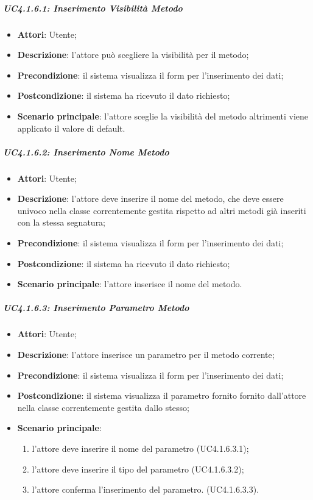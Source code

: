 \subparagraph{UC4.1.6.1: Inserimento Visibilità Metodo}
\label{UC4.1.6.1}
\begin{itemize}
\item \textbf{Attori}: Utente;
\item \textbf{Descrizione}: l'attore può scegliere la visibilità per il metodo;
\item \textbf{Precondizione}: il sistema visualizza il form per l'inserimento dei dati;
\item \textbf{Postcondizione}: il sistema ha ricevuto il dato richiesto;
\item \textbf{Scenario principale}:
l'attore sceglie la visibilità del metodo altrimenti viene applicato il valore di default.
\end{itemize}

\subparagraph{UC4.1.6.2: Inserimento Nome Metodo}
\label{UC4.1.6.2}
\begin{itemize}
\item \textbf{Attori}: Utente;
\item \textbf{Descrizione}: l'attore deve inserire il nome del metodo, che deve essere univoco nella classe correntemente gestita rispetto ad altri metodi già inseriti con la stessa segnatura;
\item \textbf{Precondizione}: il sistema visualizza il form per l'inserimento dei dati;
\item \textbf{Postcondizione}: il sistema ha ricevuto il dato richiesto;
\item \textbf{Scenario principale}:
l'attore inserisce il nome del metodo.
\end{itemize}

\subparagraph{UC4.1.6.3: Inserimento Parametro Metodo}
\label{UC4.1.6.3}
\begin{itemize}
\item \textbf{Attori}: Utente;
\item \textbf{Descrizione}: l'attore inserisce un parametro per il metodo corrente;
\item \textbf{Precondizione}: il sistema visualizza il form per l'inserimento dei dati;
\item \textbf{Postcondizione}: il sistema visualizza il parametro fornito fornito dall'attore nella classe correntemente gestita dallo stesso;
\item \textbf{Scenario principale}:
\begin{enumerate}
	\item l'attore deve inserire il nome del parametro (UC4.1.6.3.1);
	\item l'attore deve inserire il tipo del parametro (UC4.1.6.3.2);
	\item l'attore conferma l'inserimento del parametro. (UC4.1.6.3.3).
\end{enumerate}
\end{itemize}

